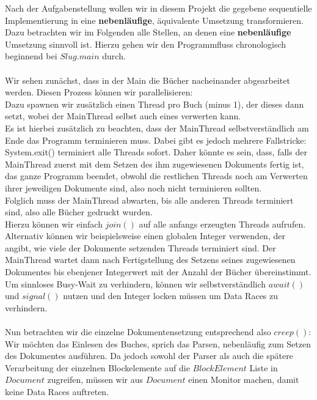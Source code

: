 \documentclass[12pt,a4paper]{scrartcl}
\numberwithin{equation}{section}
\begin{document}
Nach der Aufgabenstellung wollen wir in diesem Projekt die gegebene sequentielle Implementierung in eine \textbf{nebenläufige}, äquivalente Umsetzung transformieren. \\
Dazu betrachten wir im Folgenden alle Stellen, an denen eine \textbf{nebenläufige} Umsetzung sinnvoll ist. Hierzu gehen wir den Programmfluss chronologisch beginnend bei $ Slug.main $ durch.\\\\
Wir sehen zunächst, dass in der Main die Bücher nacheinander abgearbeitet werden. Diesen Prozess können wir parallelisieren: \\
Dazu spawnen wir zusätzlich einen Thread pro Buch (minus 1), der dieses dann setzt, wobei der MainThread selbst auch eines verwerten kann.\\
Es ist hierbei zusätzlich zu beachten, dass der MainThread selbstverständlich am Ende das Programm terminieren muss. Dabei gibt es jedoch mehrere Fallstricke:\\
System.exit() terminiert alle Threads sofort. Daher könnte es sein, dass, falls der MainThread zuerst mit dem Setzen des ihm zugewiesenen Dokuments fertig ist, das ganze Programm beendet, obwohl die restlichen Threads noch am Verwerten ihrer jeweiligen Dokumente sind, also noch nicht terminieren sollten. \\
Folglich muss der MainThread abwarten, bis alle anderen Threads terminiert sind, also alle Bücher gedruckt wurden.  \\
Hierzu können wir einfach $ join() $ auf alle anfangs erzeugten Threads aufrufen.\\
Alternativ können wir beispielsweise einen globalen Integer verwenden, der angibt, wie viele der Dokumente setzenden Threads terminiert sind. Der MainThread wartet dann nach Fertigstellung des Setzens seines zugewiesenen Dokumentes bis ebenjener Integerwert mit der Anzahl der Bücher übereinstimmt. \\
Um sinnloses Busy-Wait zu verhindern, können wir selbstverständlich $ await() $ und $ signal() $ nutzen und den Integer locken müssen um Data Races zu verhindern.\\
\\
Nun betrachten wir die einzelne Dokumentensetzung entsprechend also $ creep() $:\\
Wir möchten das Einlesen des Buches, sprich das Parsen, nebenläufig zum Setzen des Dokumentes ausführen. Da jedoch sowohl der Parser als auch die spätere Verarbeitung der einzelnen Blockelemente auf die $ BlockElement $ Liste in $ Document $ zugreifen, müssen wir aus $ Document $ einen Monitor machen, damit keine Data Races auftreten.\\
\end{document}
